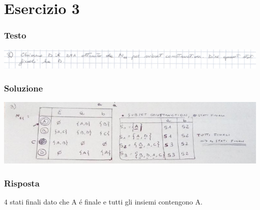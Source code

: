 \chapter{Esercizio 3}

\subsection{Testo}

\begin{center}
    \includegraphics[scale=0.2]{Chapters/Img/03text.png}\\
\end{center} 

\subsection{Soluzione}

\begin{center}
    \includegraphics[scale=0.6]{Chapters/Img/03solution.png}\\
\end{center} 

\subsection{Risposta}
4 stati finali dato che A \'e finale e tutti gli insiemi contengono A.